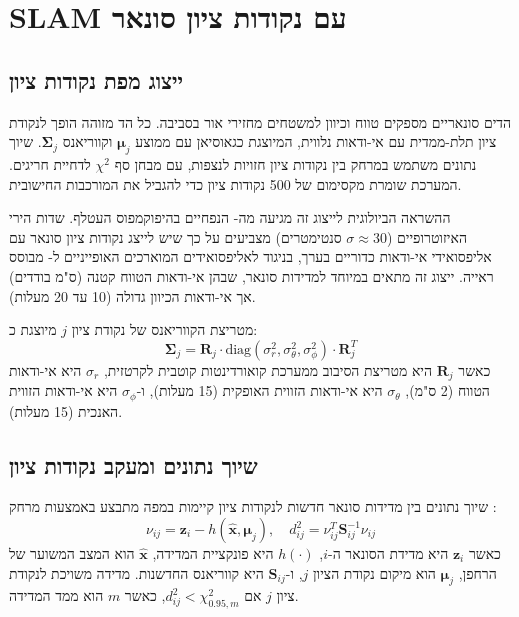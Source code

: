 

\section{SLAM  עם נקודות ציון סונאר}
\label{sec:ch04_slam}

\subsection{ייצוג מפת נקודות ציון}
\label{sec:ch04_landmark_representation}

הדים סונאריים מספקים טווח וכיוון למשטחים מחזירי אור בסביבה. כל הד מזוהה הופך לנקודת ציון תלת-ממדית עם אי-ודאות נלווית, המיוצגת כגאוסיאן עם ממוצע $\boldsymbol{\mu}_j$ וקווריאנס $\boldsymbol{\Sigma}_j$. שיוך נתונים משתמש במרחק  בין נקודות ציון חזויות לנצפות, עם מבחן סף $\chi^2$ לדחיית חריגים. המערכת שומרת מקסימום של 500 נקודות ציון כדי להגביל את המורכבות החישובית.

ההשראה הביולוגית לייצוג זה מגיעה מה- הנפחיים בהיפוקמפוס העטלף. שדות הירי האיזוטרופיים ($\sigma \approx 30$ סנטימטרים) מצביעים על כך שיש לייצג נקודות ציון סונאר עם אליפסואידי אי-ודאות כדוריים בערך, בניגוד לאליפסואידים המוארכים האופייניים ל- מבוסס ראייה. ייצוג זה מתאים במיוחד למדידות סונאר, שבהן אי-ודאות הטווח קטנה (ס"מ בודדים) אך אי-ודאות הכיוון גדולה (10 עד 20 מעלות).

מטריצת הקווריאנס של נקודת ציון $j$ מיוצגת כ:
\begin{equation}
\boldsymbol{\Sigma}_j = \mathbf{R}_j \cdot \text{diag}(\sigma_r^2, \sigma_\theta^2, \sigma_\phi^2) \cdot \mathbf{R}_j^T
\label{eq:ch04_landmark_cov}
\end{equation}
כאשר $\mathbf{R}_j$ היא מטריצת הסיבוב ממערכת קואורדינטות קוטבית לקרטזית, $\sigma_r$ היא אי-ודאות הטווח (2 ס"מ), $\sigma_\theta$ היא אי-ודאות הזווית האופקית (15 מעלות), ו-$\sigma_\phi$ היא אי-ודאות הזווית האנכית (15 מעלות).

\subsection{שיוך נתונים ומעקב נקודות ציון}
\label{sec:ch04_data_association}

שיוך נתונים בין מדידות סונאר חדשות לנקודות ציון קיימות במפה מתבצע באמצעות מרחק :
\begin{equation}
\nu_{ij} = \mathbf{z}_i - h(\hat{\mathbf{x}}, \boldsymbol{\mu}_j), \quad d_{ij}^2 = \nu_{ij}^T \mathbf{S}_{ij}^{-1} \nu_{ij}
\label{eq:ch04_mahalanobis}
\end{equation}
כאשר $\mathbf{z}_i$ היא מדידת הסונאר ה-$i$, $h(\cdot)$ היא פונקציית המדידה, $\hat{\mathbf{x}}$ הוא המצב המשוער של הרחפן, $\boldsymbol{\mu}_j$ הוא מיקום נקודת הציון $j$, ו-$\mathbf{S}_{ij}$ היא קווריאנס החדשנות. מדידה משויכת לנקודת ציון $j$ אם $d_{ij}^2 < \chi^2_{0.95, m}$, כאשר $m$ הוא ממד המדידה.

